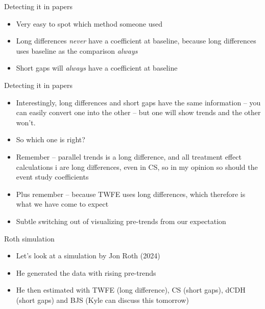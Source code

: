 \documentclass{beamer}
\begin{document}
\begin{frame}{Detecting it in papers}

\begin{itemize}

\item Very easy to spot which method someone used 
\item Long differences \emph{never} have a coefficient at baseline, because long differences uses baseline as the comparison \emph{always}
\item Short gaps will \emph{always} have a coefficient at baseline

\end{itemize}

\end{frame}

\begin{frame}{Detecting it in papers}

\begin{itemize}

\item Interestingly, long differences and short gaps have the same information -- you can easily convert one into the other -- but one will show trends and the other won't.
\item So which one is right?  
\item Remember -- parallel trends is a long difference, and all treatment effect calculations i are long differences, even in CS, so in my opinion so should the event study coefficients
\item Plus remember -- because TWFE uses long differences, which therefore is what we have come to expect 
\item Subtle switching out of visualizing pre-trends from our expectation

\end{itemize}

\end{frame}

\begin{frame}{Roth simulation}

\begin{itemize}
\item Let's look at a simulation by Jon Roth (2024) 
\item He generated the data with rising pre-trends 
\item He then estimated with TWFE (long difference), CS (short gaps), dCDH (short gaps) and BJS (Kyle can discuss this tomorrow)
\end{itemize}

\end{frame}
\end{document}
